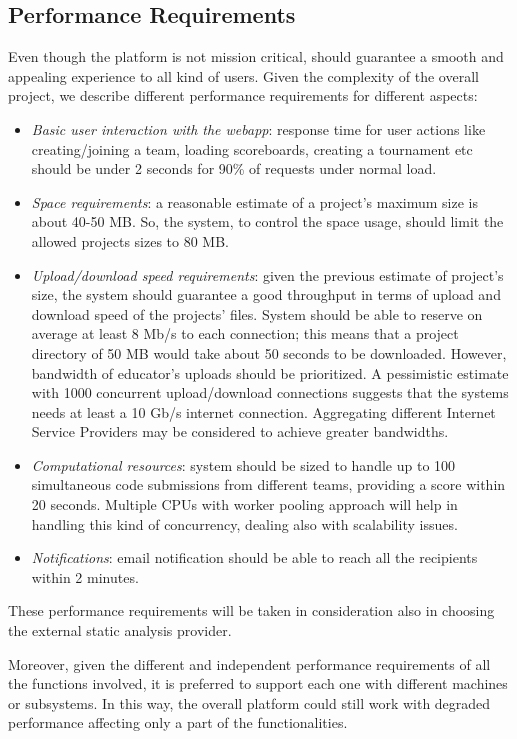 \subsection{Performance Requirements}
Even though the platform is not mission critical, should guarantee a smooth and appealing experience to all kind of users. Given the complexity of the overall project, we describe different performance requirements for different aspects:
\begin{itemize}
    \item \textit{Basic user interaction with the webapp}: response time for user actions like creating/joining a team, loading scoreboards, creating a tournament etc should be under 2 seconds for 90\% of requests under normal load.
    \item \textit{Space requirements}: a reasonable estimate of a project’s maximum size is about 40-50 MB. So, the system, to control the space usage, should limit the allowed projects sizes to 80 MB.
    \item \textit{Upload/download speed requirements}: given the previous estimate of project’s size, the system should guarantee a good throughput in terms of upload and download speed of the projects’ files. System should be able to reserve on average at least 8 Mb/s to each connection; this means that a project directory of 50 MB would take about 50 seconds to be downloaded. However, bandwidth of educator’s uploads should be prioritized. A pessimistic estimate with 1000 concurrent upload/download connections suggests that the systems needs at least a 10 Gb/s internet connection. Aggregating different Internet Service Providers may be considered to achieve greater bandwidths.
    \item \textit{Computational resources}: system should be sized to handle up to 100 simultaneous code submissions from different teams, providing a score within 20 seconds. Multiple CPUs with worker pooling approach will help in handling this kind of concurrency, dealing also with scalability issues.
    \item \textit{Notifications}: email notification should be able to reach all the recipients within 2 minutes.
\end{itemize}
These performance requirements will be taken in consideration also in choosing the external static analysis provider.

Moreover, given the different and independent performance requirements of all the functions involved, it is preferred to support each one with different machines or subsystems. In this way, the overall platform could still work with degraded performance affecting only a part of the functionalities.

